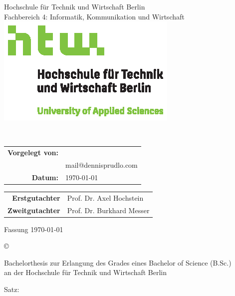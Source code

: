 \pagestyle{empty}

%
\begin{center}
	\footnotesize{%
		Hochschule für Technik und Wirtschaft Berlin\\
		Fachbereich 4: Informatik, Kommunikation und Wirtschaft
	}\\[20pt]
	\includegraphics[scale=1]{images/htwlogo}\\[40pt]
	\begin{spacing}{1.5}
		\Large{\textbf{\thetitle}}\normalsize\\[40pt]
	\end{spacing}
\end{center}
\begin{center}
	\begin{tabular}{ r l }
		\textbf{Vorgelegt von:} & \theauthor \\
		& mail@dennisprudlo.com \\[20pt]
		\textbf{Datum:} & \today
	\end{tabular}
	\mbox{}\vfill
	\begin{tabular}{ r l }
		\textbf{Erstgutachter} & Prof. Dr. Axel Hochstein \\
		\textbf{Zweitgutachter} & Prof. Dr. Burkhard Messer
	\end{tabular}
\end{center}
\clearpage

%
Fassung \today
\mbox{}\vfill
\footnotesize{%
	© \the\year{} \theauthor\par
	Bachelorthesis zur Erlangung des Grades eines Bachelor of Science (B.Sc.)\\%
	an der Hochschule für Technik und Wirtschaft Berlin\par
	Satz: \XeLaTeX \the\eTeXversion\eTeXrevision
}
\restoregeometry
\normalsize
\clearpage
